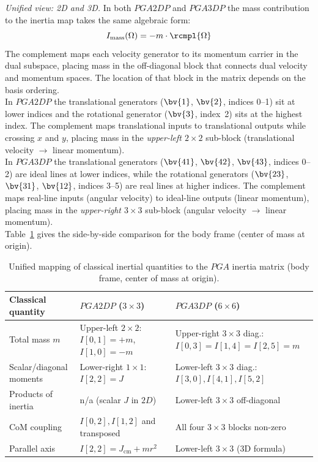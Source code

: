 \emph{Unified view: 2D and 3D.}
In both $PGA2DP$ and $PGA3DP$ the mass contribution to the inertia map takes the same
algebraic form:
\begin{equation}
    I_\mathrm{mass}(\Omega) = -m \cdot \rcmpl{\Omega}
    \label{eq:inertia_mass_dual}
\end{equation}
The complement maps each velocity generator to its momentum carrier in the dual subspace,
placing mass in the off-diagonal block that connects dual velocity and momentum spaces.
The location of that block in the matrix depends on the basis ordering. \\

In $PGA2DP$ the translational generators ($\bv{1}$, $\bv{2}$, indices 0--1) sit at lower
indices and the rotational generator ($\bv{3}$, index~2) sits at the highest index. The
complement maps translational inputs to translational outputs while crossing $x$ and $y$,
placing mass in the \emph{upper-left $2\times2$} sub-block (translational velocity $\to$
linear momentum). \\

In $PGA3DP$ the translational generators ($\bv{41}$, $\bv{42}$, $\bv{43}$, indices 0--2)
are ideal lines at lower indices, while the rotational generators ($\bv{23}$, $\bv{31}$,
$\bv{12}$, indices 3--5) are real lines at higher indices. The complement maps real-line
inputs (angular velocity) to ideal-line outputs (linear momentum), placing mass in the
\emph{upper-right $3\times3$} sub-block (angular velocity $\to$ linear momentum). \\

Table~\ref{tab:unified_pga} gives the side-by-side comparison for the body frame (center
of mass at origin).

\begin{table}[h!]
\centering\small
\begin{tabular}{p{3.1cm}|p{4.1cm}|p{5.1cm}}
\hline
Classical quantity & $PGA2DP$ ($3\times3$) & $PGA3DP$ ($6\times6$) \\
\hline
Total mass $m$ &
    Upper-left $2\times2$: $I[0,1]=+m$, $I[1,0]=-m$ &
    Upper-right $3\times3$ diag.: $I[0,3]=I[1,4]=I[2,5]=m$ \\
Scalar/diagonal moments &
    Lower-right $1\times1$: $I[2,2]=J$ &
    Lower-left $3\times3$ diag.: $I[3,0], I[4,1], I[5,2]$ \\
Products of inertia &
    n/a (scalar $J$ in $2D$) &
    Lower-left $3\times3$ off-diagonal \\
CoM coupling &
    $I[0,2], I[1,2]$ and transposed &
    All four $3\times3$ blocks non-zero \\
Parallel axis &
    $I[2,2] = J_\mathrm{cm} + mr^2$ &
    Lower-left $3\times3$ (3D formula) \\
\hline
\end{tabular}
\caption{Unified mapping of classical inertial quantities to the $PGA$ inertia matrix
(body frame, center of mass at origin).}
\label{tab:unified_pga}
\end{table}

